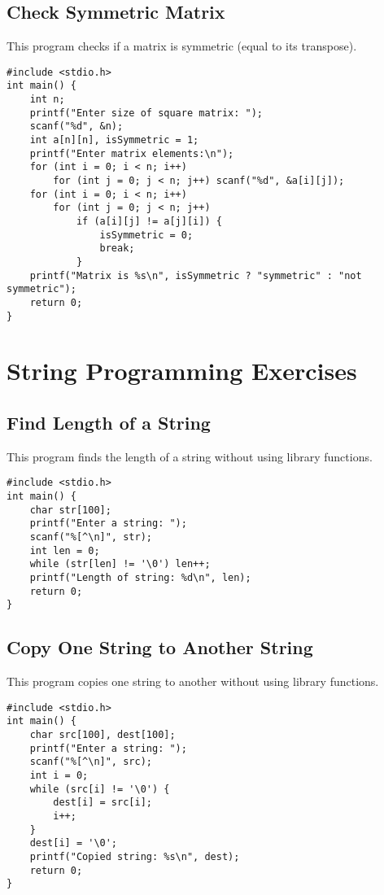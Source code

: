 \documentclass[a4paper,12pt]{article}
\begin{document}
\subsection{Check Symmetric Matrix}
This program checks if a matrix is symmetric (equal to its transpose).
\begin{lstlisting}[caption={Check Symmetric Matrix}]
#include <stdio.h>
int main() {
    int n;
    printf("Enter size of square matrix: ");
    scanf("%d", &n);
    int a[n][n], isSymmetric = 1;
    printf("Enter matrix elements:\n");
    for (int i = 0; i < n; i++)
        for (int j = 0; j < n; j++) scanf("%d", &a[i][j]);
    for (int i = 0; i < n; i++)
        for (int j = 0; j < n; j++)
            if (a[i][j] != a[j][i]) {
                isSymmetric = 0;
                break;
            }
    printf("Matrix is %s\n", isSymmetric ? "symmetric" : "not symmetric");
    return 0;
}
\end{lstlisting}
\clearpage

\section{String Programming Exercises}

\subsection{Find Length of a String}
This program finds the length of a string without using library functions.
\begin{lstlisting}[caption={Find Length of a String}]
#include <stdio.h>
int main() {
    char str[100];
    printf("Enter a string: ");
    scanf("%[^\n]", str);
    int len = 0;
    while (str[len] != '\0') len++;
    printf("Length of string: %d\n", len);
    return 0;
}
\end{lstlisting}
\clearpage

\subsection{Copy One String to Another String}
This program copies one string to another without using library functions.
\begin{lstlisting}[caption={Copy One String to Another String}]
#include <stdio.h>
int main() {
    char src[100], dest[100];
    printf("Enter a string: ");
    scanf("%[^\n]", src);
    int i = 0;
    while (src[i] != '\0') {
        dest[i] = src[i];
        i++;
    }
    dest[i] = '\0';
    printf("Copied string: %s\n", dest);
    return 0;
}
\end{lstlisting}
\clearpage
\end{document}
